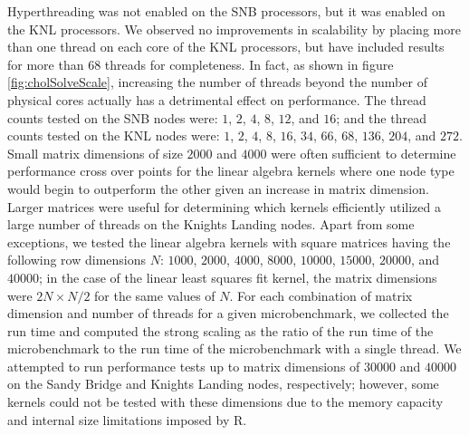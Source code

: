 Hyperthreading was not enabled on the SNB processors, but it was enabled on the KNL
processors. We observed no improvements in scalability by placing more than one thread on
each core of the KNL processors, but have included results for more than 68 threads for
completeness. In fact, as shown in figure \ref{fig:cholSolveScale}, increasing the number
of threads beyond the number of physical cores actually has a detrimental effect on
performance. The thread counts tested on the SNB nodes were: $1$, $2$, $4$, $8$, $12$, and
$16$; and the thread counts tested on the KNL nodes were: $1$, $2$, $4$, $8$, $16$, $34$,
$66$, $68$, $136$, $204$, and $272$. Small matrix dimensions of size $2000$ and $4000$
were often sufficient to determine performance cross over points for the linear algebra
kernels where one node type would begin to outperform the other given an increase in
matrix dimension. Larger matrices were useful for determining which kernels efficiently
utilized a large number of threads on the Knights Landing nodes. Apart from some
exceptions, we tested the linear algebra kernels with square matrices having the following
row dimensions $N$: $1000$, $2000$, $4000$, $8000$, $10000$, $15000$, $20000$, and
$40000$; in the case of the linear least squares fit kernel, the matrix dimensions were
$2N \times N/2$ for the same values of $N$. For each combination of matrix dimension and
number of threads for a given microbenchmark, we collected the run time and computed the
strong scaling as the ratio of the run time of the microbenchmark to the run time of the
microbenchmark with a single thread. We attempted to run performance tests up to matrix
dimensions of $30000$ and $40000$ on the Sandy Bridge and Knights Landing nodes,
respectively; however, some kernels could not be tested with these dimensions due to the
memory capacity and internal size limitations imposed by R.


